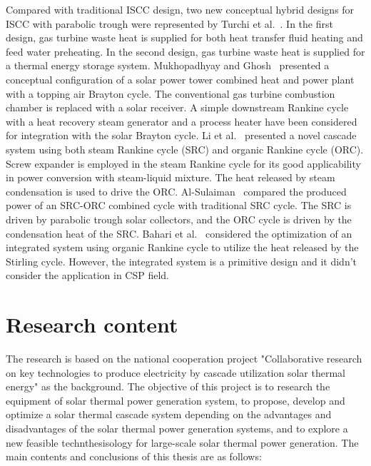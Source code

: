 Compared with traditional ISCC design, two new conceptual hybrid designs for ISCC with parabolic trough were represented by Turchi et al.~\cite{Turchi2014}. In the first design, gas turbine waste heat is supplied for both heat transfer fluid heating and feed water preheating. In the second design, gas turbine waste heat is supplied for a thermal energy storage system.
Mukhopadhyay and Ghosh~\cite{Mukhopadhyay2016} presented a conceptual configuration of a solar power tower combined heat and power plant with a topping air Brayton cycle. The conventional gas turbine combustion chamber is replaced with a solar receiver. A simple downstream Rankine cycle with a heat recovery steam generator and a process heater have been considered for integration with the solar Brayton cycle.
Li et al.~\cite{Li2016a} presented a novel cascade system using both steam Rankine cycle (SRC) and organic Rankine cycle (ORC). Screw expander is employed in the steam Rankine cycle for its good applicability in power conversion with steam-liquid mixture. The heat released by steam condensation is used to drive the ORC.
Al-Sulaiman~\cite{AlSulaiman2014} compared the produced power of an SRC-ORC combined cycle with traditional SRC cycle. The SRC is driven by parabolic trough solar collectors, and the ORC cycle is driven by the condensation heat of the SRC.
Bahari et al.~\cite{Bahari2016} considered the optimization of an integrated system using organic Rankine cycle to utilize the heat released by the Stirling cycle. However, the integrated system is a primitive design and it didn't consider the application in CSP field.


\section{Research content}\label{sec:3}

The research is based on the national cooperation project "Collaborative research on key technologies to produce electricity by cascade utilization solar thermal energy" as the background. The objective of this project is to research the equipment of solar thermal power generation system, to propose, develop and optimize a solar thermal cascade system depending on the advantages and disadvantages of the solar thermal power generation systems, and to explore a new feasible technthesisology for large-scale solar thermal power generation. The main contents and conclusions of this thesis are as follows:

